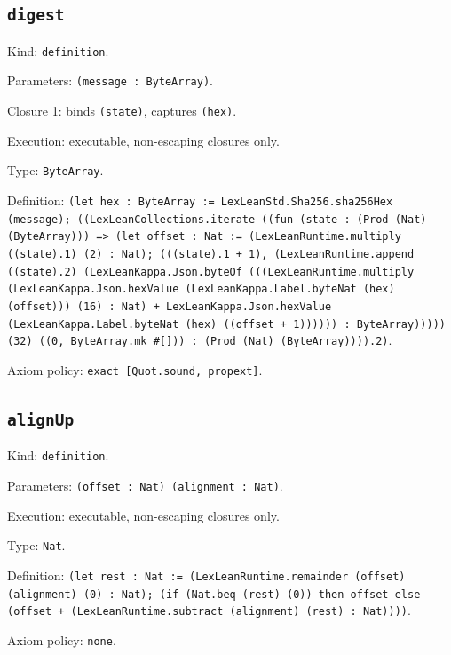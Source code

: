 \documentclass[11pt]{article}
\begin{document}
\subsection*{\texttt{digest}}
\noindent Kind: \texttt{definition}.\par
\noindent Parameters: \texttt{(message : ByteArray)}.\par
\noindent Closure 1: binds \texttt{(state)}, captures \texttt{(hex)}.\par
\noindent Execution: executable, non-escaping closures only.\par
\noindent Type: \texttt{ByteArray}.\par
\noindent Definition: \texttt{(let hex : ByteArray := LexLeanStd.Sha256.sha256Hex (message); ((LexLeanCollections.iterate ((fun (state : (Prod (Nat) (ByteArray))) => (let offset : Nat := (LexLeanRuntime.multiply ((state).1) (2) : Nat); (((state).1 + 1), (LexLeanRuntime.append ((state).2) (LexLeanKappa.Json.byteOf (((LexLeanRuntime.multiply (LexLeanKappa.Json.hexValue (LexLeanKappa.Label.byteNat (hex) (offset))) (16) : Nat) + LexLeanKappa.Json.hexValue (LexLeanKappa.Label.byteNat (hex) ((offset + 1)))))) : ByteArray))))) (32) ((0, ByteArray.mk \#[])) : (Prod (Nat) (ByteArray)))).2)}.\par
\noindent Axiom policy: \texttt{exact [Quot.sound, propext]}.\par
\subsection*{\texttt{alignUp}}
\noindent Kind: \texttt{definition}.\par
\noindent Parameters: \texttt{(offset : Nat) (alignment : Nat)}.\par
\noindent Execution: executable, non-escaping closures only.\par
\noindent Type: \texttt{Nat}.\par
\noindent Definition: \texttt{(let rest : Nat := (LexLeanRuntime.remainder (offset) (alignment) (0) : Nat); (if (Nat.beq (rest) (0)) then offset else (offset + (LexLeanRuntime.subtract (alignment) (rest) : Nat))))}.\par
\noindent Axiom policy: \texttt{none}.\par
\end{document}
